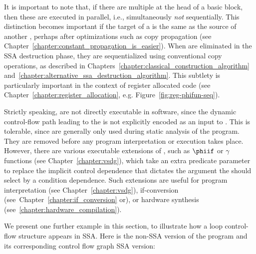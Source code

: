 It is important to note that, if there are multiple \phifuns{}
at the head of a basic block, then these are executed in parallel, 
i.e., simultaneously \textit{not} sequentially.
This distinction becomes important if the target of a \phifun
is the same as the source of another \phifun, perhaps after
optimizations such as copy propagation
(see Chapter~\ref{chapter:constant_propagation_is_easier}).
When \phifuns are eliminated in the SSA destruction phase,
they are sequentialized using conventional 
copy operations,
as described in Chapters~\ref{chapter:classical_construction_algorithm} and~\ref{chapter:alternative_ssa_destruction_algorithm}. This subtlety is particularly important in the context of register allocated code (see Chapter~\ref{chapter:register_allocation}, e.g. Figure~\ref{fig:reg-phifun-seq}).



Strictly speaking, \phifuns are not directly executable in software,
since the dynamic control-flow path leading to the \phifun
is not explicitly encoded as an input to \phifun.
This is tolerable, since \phifuns are generally only 
used during static analysis of the program. They are removed
before any program interpretation or execution takes place.
However, there are various executable extensions of \phifuns, 
such as $\phiif$ or $\gamma$ functions (see Chapter~\ref{chapter:vsdg}), which take
an extra predicate parameter to replace the implicit
control dependence that dictates the argument the \phifun should select by a condition dependence. Such extensions are useful for program interpretation (see Chapter~\ref{chapter:vsdg}), if-conversion (see~Chapter~\ref{chapter:if_conversion} or), or hardware synthesis (see~\ref{chapter:hardware_compilation}).



We present one further example in this section,
to illustrate how a %
loop control-flow structure appears in SSA.
Here is the non-SSA version of the program and its corresponding control flow graph SSA version:

